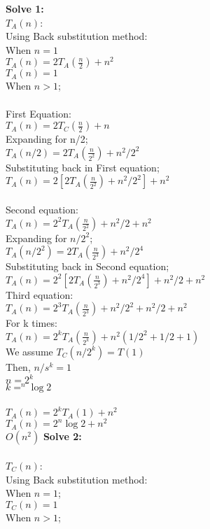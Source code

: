 \documentclass[a4paper]{exam}
\begin{document}
\begin{questions}
  \begin{solution}
  \textbf{Solve 1:}\\
  $T_A(n)$:
  \\Using Back substitution method:\\
  When $n=1$
  \\$T_A(n) = 2 T_A(\frac{n}{2}) + n^2$
  \\$T_A(n)=1$
  \\When $n>1$;
  \\
  \\First Equation:
  \\$T_A(n)= 2T_C(\frac{n}{2}) + n$
  \\Expanding for n/2;
  \\$T_A(n/2)= 2T_A(\frac{n}{2^2}) + n^2/2^2$
  \\Substituting back in First equation;
  \\$T_A(n)= 2[2T_A(\frac{n}{2^2}) + n^2/2^2] + n^2$
  \\
  \\Second equation:
  \\$T_A(n)= 2^2T_A(\frac{n}{2^2}) + n^2/2 + n^2$
  \\Expanding for $n/2^2$;
  \\$T_A(n/2^2)= 2T_A(\frac{n}{2^3}) + n^2/2^4$
  \\Substituting back in Second equation;
  \\$T_A(n)= 2^2[2T_A(\frac{n}{2^3}) + n^2/2^4] + n^2/2 + n^2$
  \\Third equation:
  \\$T_A(n)= 2^3T_A(\frac{n}{2^3}) + n^2/2^2 + n^2/2 + n^2$
  \\For k times:
  \\$T_A(n)= 2^kT_A(\frac{n}{2^k}) + n^2(1/2^2+1/2+1)$
  \\We assume $T_C(n/2^k) = T(1)$ 
  \\Then, $n/s^k = 1$
  \\$n = 2^k$
  \\$k=^n\log 2$
  \\
  \\$T_A(n)= 2^kT_A(1) + n^2$
  \\$T_A(n)= 2^n\log 2 + n^2$
  \\$O(n^2)$
\textbf{Solve 2:}\\
\\
$T_C(n)$:
\\
Using Back substitution method:\\
When $n=1$;
\\$T_C(n)=1$
\\When $n>1$;

\end{solution}
\end{questions}
\end{document}
